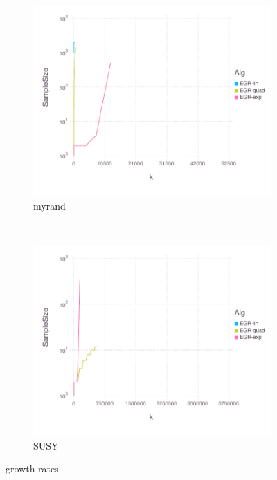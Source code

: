 \documentclass[11pt]{article}
\begin{document}
  
  \begin{figure}[H]
      \centering
      \begin{subfigure}[b]{0.45\textwidth}
          \includegraphics[width=\textwidth]{Figures/myrandBLtrueSampleSizefFinal.pdf}
          \caption{myrand}
      \end{subfigure}
      ~ %
        \begin{subfigure}[b]{0.45\textwidth}
          \includegraphics[width=\textwidth]{Figures/SUSYBLtrueSampleSizefFinal.pdf}
            \caption{SUSY}
        \end{subfigure}
      \caption{growth rates}\label{fig:alphaGoodsummary}
  \end{figure}
  
\end{document}
